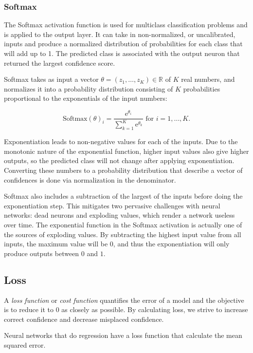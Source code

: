\documentclass[a4paper]{article}
\newcommand{\euler}{\mathrm{e}}
\begin{document}
\subsubsection*{Softmax}
The Softmax activation function is used for multiclass classification problems and is applied to the output layer. It can take in non-normalized, or uncalibrated, inputs and produce a normalized distribution of probabilities for each class that will add up to 1. The predicted class is associated with the output neuron that returned the largest confidence score.

Softmax takes as input a vector $\theta = (z_1, \ldots, z_K) \in \mathbb{R}$ of $K$ real numbers, and normalizes it into a probability distribution consisting of $K$ probabilities proportional to the exponentials of the input numbers:

\begin{equation*}
    \text{Softmax}(\theta)_i = \frac{\euler^{\theta_i}}{\sum_{k=1}^K \euler^{\theta_k}} \text{ for } i = 1, \ldots, K.
\end{equation*}

Exponentiation leads to non-negative values for each of the inputs. Due to the monotonic nature of the exponential function, higher input values also give higher outputs, so the predicted class will not change after applying exponentiation. Converting these numbers to a probability distribution that describe a vector of confidences is done via normalization in the denominator.

Softmax also includes a subtraction of the largest of the inputs before doing the exponentiation step. This mitigates two pervasive challenges with neural networks: dead neurons and exploding values, which render a network useless over time. The exponential function in the Softmax activation is actually one of the sources of exploding values. By subtracting the highest input 
value from all inputs, the maximum value will be $0$, and thus the exponentiation will only produce 
outputs between $0$ and $1$.

\subsection*{Loss}
A \emph{loss function} or \emph{cost function} quantifies the error of a model and the objective is to reduce it to $0$ as closely as possible. By calculating loss, we strive to increase correct confidence and decrease misplaced confidence.

Neural networks that do regression have a loss function that calculate the mean squared error.
\end{document}
